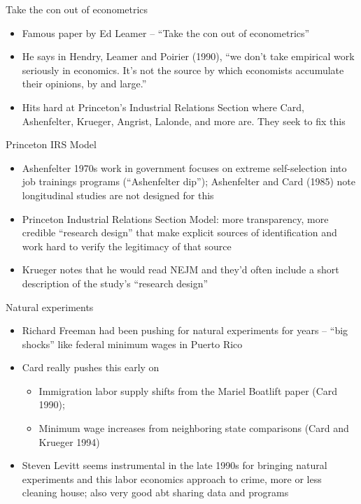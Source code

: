 \documentclass{beamer}
\begin{document}
\begin{frame}{Take the con out of econometrics}

\begin{itemize}
\item Famous paper by Ed Leamer -- ``Take the con out of econometrics''
\item He says in Hendry, Leamer and Poirier (1990), ``we don't take empirical work seriously in economics. It's not the source by which economists accumulate their opinions, by and large.''
\item Hits hard at Princeton's Industrial Relations Section where Card, Ashenfelter, Krueger, Angrist, Lalonde, and more are. They seek to fix this
\end{itemize}

\end{frame}

\begin{frame}{Princeton IRS Model}

\begin{itemize}
\item Ashenfelter 1970s work in government focuses on extreme self-selection into job trainings programs (``Ashenfelter dip''); Ashenfelter and Card (1985) note longitudinal studies are not designed for this 
\item Princeton Industrial Relations Section Model: more transparency, more credible ``research design'' that make explicit sources of identification and work hard to verify the legitimacy of that source
\item Krueger notes that he would read NEJM and they'd often include a short description of the study's ``research design''
\end{itemize}

\end{frame}

\begin{frame}{Natural experiments}

\begin{itemize}
\item Richard Freeman had been pushing for natural experiments for years -- ``big shocks'' like federal minimum wages in Puerto Rico
\item Card really pushes this early on 
	\begin{itemize}
	\item Immigration labor supply shifts from the Mariel Boatlift paper (Card 1990); 
	\item Minimum wage increases from neighboring state comparisons (Card and Krueger 1994)
	\end{itemize}
\item Steven Levitt seems instrumental in the late 1990s for bringing natural experiments and this labor economics approach to crime, more or less cleaning house; also very good abt sharing data and programs
\end{itemize}

\end{frame}
\end{document}
